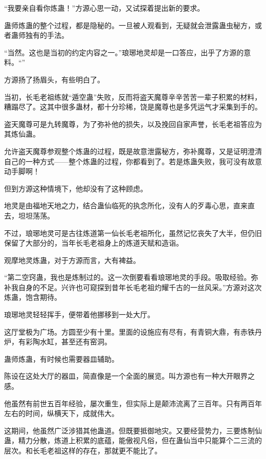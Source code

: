 
\begin{this_body}



“我要亲自看你炼蛊！”方源心思一动，又试探着提出新的要求。

蛊师炼蛊的整个过程，都是隐秘的。一旦被人观看到，无疑就会泄露蛊虫秘方，或者蛊师独有的手法。

“当然。这也是当初的约定内容之一。”琅琊地灵却是一口答应，出乎了方源的意料。“”

方源扬了扬眉头，有些明白了。

当初，长毛老祖练就“遁空蛊”失败，反而将盗天魔尊辛辛苦苦一辈子积累的材料，糟蹋尽了。这其中很多蛊材，都十分珍稀，饶是魔尊也是多凭运气才采集到手的。

盗天魔尊可是九转魔尊，为了弥补他的损失，以及挽回自家声誉，长毛老祖答应为其炼仙蛊。

允许盗天魔尊参观整个炼蛊的过程，既是故意泄露秘方，弥补魔尊，又是证明澄清自己的一种方式——整个炼蛊的过程，你都看到了。若是炼蛊失败，我可没有故意动手脚啊！

但到方源这种情境下，他却没有了这种顾虑。

地灵是由福地天地之力，结合蛊仙临死的执念所化，没有人的歹毒心思，直来直去，坦坦荡荡。

不过，琅琊地灵可是古往炼道第一仙长毛老祖所化，虽然记忆丧失了大半，但仍旧保留了大部分的，当年长毛老祖身上的炼道天赋和造诣。

观摩地灵炼蛊，对于方源而言，大有裨益。

“第二空窍蛊，我也是炼制过的。这一次倒要看看琅琊地灵的手段。吸取经验。弥补我自身的不足。兴许也可窥探到昔年长毛老祖灼耀千古的一丝风采。”方源对这次炼蛊，饱含期待。

琅琊地灵轻轻挥手，便带着他挪移到一处大厅。

这厅堂极为广场。方圆至少有十里。里面的设施应有尽有，有青铜大鼎，有赤铁丹炉，有彩陶水缸，甚至还有窑洞。

蛊师炼蛊，有时候也需要器皿辅助。

陈设在这处大厅的器皿，简直像是一个全面的展览。叫方源也有一种大开眼界之感。

他虽然有前世五百年经验，屡次重生，但实际上是颠沛流离了三百年。只有两百年左右的时间，纵横天下，成就伟大。

这期间，他虽然广泛涉猎其他蛊道。但既要抵御地灾。又要经营势力，三要炼制仙蛊，精力分散，炼道上积累的底蕴，能傲视凡俗，但在蛊仙当中只能算个二三流的层次。和长毛老祖这样的存在，那就更不能比了。


\end{this_body}
